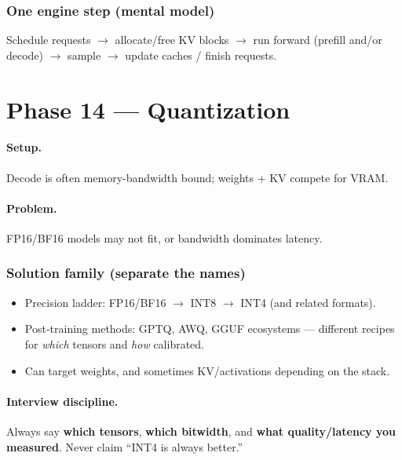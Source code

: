 \documentclass[11pt,a4paper]{article}
\begin{document}
{{\subsubsection{One engine step (mental model)}

Schedule requests $\rightarrow$ allocate/free KV blocks $\rightarrow$ run forward (prefill and/or decode) $\rightarrow$ sample $\rightarrow$ update caches / finish requests.


\bigskip


\clearpage
\section{Phase 14 --- Quantization}


\paragraph{Setup.}

Decode is often memory-bandwidth bound; weights + KV compete for VRAM.


\paragraph{Problem.}

FP16/BF16 models may not fit, or bandwidth dominates latency.


\subsubsection{Solution family (separate the names)}

\begin{itemize}
\item Precision ladder: FP16/BF16 $\rightarrow$ INT8 $\rightarrow$ INT4 (and related formats).  
\item Post-training methods: GPTQ, AWQ, GGUF ecosystems --- different recipes for \textit{which} tensors and \textit{how} calibrated.  
\item Can target weights, and sometimes KV/activations depending on the stack.
\end{itemize}


\paragraph{Interview discipline.}

Always say \textbf{which tensors}, \textbf{which bitwidth}, and \textbf{what quality/latency you measured}. Never claim ``INT4 is always better.''


}}
\end{document}
